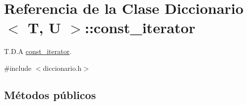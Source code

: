\hypertarget{classDiccionario_1_1const__iterator}{}\section{Referencia de la Clase Diccionario$<$ T, U $>$\+:\+:const\+\_\+iterator}
\label{classDiccionario_1_1const__iterator}


T.\+D.\+A \hyperlink{classDiccionario_1_1const__iterator}{const\+\_\+iterator}.  




{\ttfamily \#include $<$diccionario.\+h$>$}

\subsection*{Métodos públicos}
